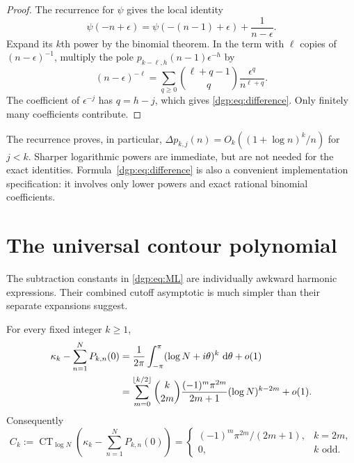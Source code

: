 \begin{proof}
The recurrence for $\psi$ gives the local identity
\[
 \psi(-n+\epsilon)=\psi(-(n-1)+\epsilon)+\frac1{n-\epsilon}.
\]
Expand its $k$th power by the binomial theorem.  In the term with
$\ell$ copies of $(n-\epsilon)^{-1}$, multiply the pole
$p_{k-\ell,h}(n-1)\epsilon^{-h}$ by
\[
 (n-\epsilon)^{-\ell}
   =\sum_{q\ge0}\binom{\ell+q-1}{q}
                       \frac{\epsilon^q}{n^{\ell+q}}.
\]
The coefficient of $\epsilon^{-j}$ has $q=h-j$, which gives
\eqref{dgp:eq:difference}.  Only finitely many coefficients contribute.
\end{proof}

The recurrence proves, in particular,
$\Delta p_{k,j}(n)=O_k((1+\log n)^k/n)$ for $j<k$.
Sharper logarithmic powers are immediate, but are not needed for the
exact identities.  Formula~\eqref{dgp:eq:difference} is also a convenient
implementation specification: it involves only lower powers and exact
rational binomial coefficients.

\section{The universal contour polynomial}
\label{dgp:sec:contour}

The subtraction constants in \eqref{dgp:eq:ML} are individually awkward
harmonic expressions.  Their combined cutoff asymptotic is much
simpler than their separate expansions suggest.

\begin{theorem}
\label{dgp:thm:contour}
For every fixed integer $k\ge1$,
\begin{align}
 \kappa_k-\sum_{n=1}^N P_{k,n}(0)
 &=\frac1{2\pi}\int_{-\pi}^{\pi}
                         (\log N+i\theta)^k\,\,\mathrm d\theta+o(1)
 \notag\\
 &=\sum_{m=0}^{\lfloor k/2\rfloor}
   \binom{k}{2m}\frac{(-1)^m\pi^{2m}}{2m+1}
                      (\log N)^{k-2m}+o(1).
 \label{dgp:eq:contour-polynomial}
\end{align}
Consequently
\begin{equation}
 C_k:=\operatorname{CT}_{\log N}\left(\kappa_k-\sum_{n=1}^N P_{k,n}(0)\right)
 =\begin{cases}
  (-1)^m\pi^{2m}/(2m+1),&k=2m,\\
  0,&k\text{ odd}.
 \end{cases}
 \label{dgp:eq:Ck}
\end{equation}
\end{theorem}

